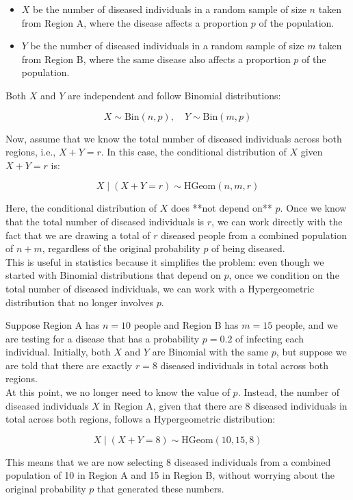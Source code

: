 \begin{itemize}
    \item \(X\) be the number of diseased individuals in a random sample of size \(n\) taken from Region A, where the disease affects a proportion \(p\) of the population.
    \item \(Y\) be the number of diseased individuals in a random sample of size \(m\) taken from Region B, where the same disease also affects a proportion \(p\) of the population.
\end{itemize}


Both \(X\) and \(Y\) are independent and follow Binomial distributions:

\[
X \sim \text{Bin}(n, p), \quad Y \sim \text{Bin}(m, p)
\]

Now, assume that we know the total number of diseased individuals across both regions, i.e., \(X + Y = r\). In this case, the conditional distribution of \(X\) given \(X + Y = r\) is:

\[
X \mid (X + Y = r) \sim \text{HGeom}(n, m, r)
\]

Here, the conditional distribution of \(X\) does **not depend on** \(p\). Once we know that the total number of diseased individuals is \(r\), we can work directly with the fact that we are drawing a total of \(r\) diseased people from a combined population of \(n + m\), regardless of the original probability \(p\) of being diseased.\\

This is useful in statistics because it simplifies the problem: even though we started with Binomial distributions that depend on \(p\), once we condition on the total number of diseased individuals, we can work with a Hypergeometric distribution that no longer involves \(p\). 

\begin{example}
    Suppose Region A has \(n = 10\) people and Region B has \(m = 15\) people, and we are testing for a disease that has a probability \(p = 0.2\) of infecting each individual. Initially, both \(X\) and \(Y\) are Binomial with the same \(p\), but suppose we are told that there are exactly \(r = 8\) diseased individuals in total across both regions.\\

    At this point, we no longer need to know the value of \(p\). Instead, the number of diseased individuals \(X\) in Region A, given that there are 8 diseased individuals in total across both regions, follows a Hypergeometric distribution:
    
    \[
    X \mid (X + Y = 8) \sim \text{HGeom}(10, 15, 8)
    \]
    
    This means that we are now selecting 8 diseased individuals from a combined population of 10 in Region A and 15 in Region B, without worrying about the original probability \(p\) that generated these numbers.
\end{example}

